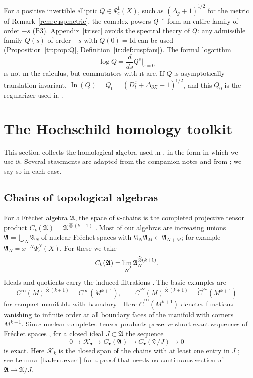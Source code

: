 \documentclass[11pt,oneside,reqno]{article}
\DeclareMathOperator{\In}{In}
\newcommand{\cK}{\mathcal K}
\newcommand{\Psic}{\Psi_{c}}
\newcommand{\CI}{C^\infty}
\newcommand{\dCI}{\dot C^\infty}
\newcommand{\lQ}{\log Q}
\theoremstyle{plain}
\theoremstyle{definition}
\theoremstyle{remark}
\begin{document}
For a positive invertible elliptic \(Q\in\Psic^1(X)\), such as
\((\Delta_g+1)^{1/2}\) for the metric of Remark~\ref{rem:cuspmetric}, the
complex powers \(Q^{-s}\) form an entire family of order \(-s\) (B3).
Appendix~\ref{tr:sec} avoids the spectral theory of \(Q\): any admissible
family \(Q(s)\) of order \(-s\) with \(Q(0)=\mathrm{Id}\) can be used
(Proposition~\ref{tr:prop:Q}, Definition~\ref{tr:def:cuspfam}). The
formal logarithm
\[
 \lQ=\frac{d}{ds}Q^s\Big|_{s=0}
\]
is not in the calculus, but commutators with it are. If \(Q\) is
asymptotically translation invariant, \(\In(Q)=Q_0=(D_t^2+\Delta_{\partial
X}+1)^{1/2}\), and this \(Q_0\) is the regularizer used in \cite[(60)]{MN}.

\section{The Hochschild homology toolkit}\label{sec:hhtools}

This section collects the homological algebra used in \cite{MN}, in the form
in which we use it. Several statements are adapted from the companion notes
\cite{HHb} and from \cite[Ch.~10]{MelroseMicro}; we say so in each case.

\subsection{Chains of topological algebras}\label{subsec:chains}
For a Fr\'echet algebra \(\mathfrak A\), the space of \(k\)-chains is the
completed projective tensor product \(C_k(\mathfrak A)=\mathfrak
A^{\widehat\otimes(k+1)}\) \cite[(36)]{MN}. Most of our algebras are
increasing unions \(\mathfrak A=\bigcup_N\mathfrak A_N\) of nuclear
Fr\'echet spaces with \(\mathfrak A_N\mathfrak A_M\subset\mathfrak
A_{N+M}\); for example \(\mathfrak A_N=x^{-N}\Psic^N(X)\). For these we
take
\[
 C_k(\mathfrak A)=\varinjlim_N\mathfrak A_N^{\widehat\otimes(k+1)} .
\]
Ideals and quotients carry the induced filtrations \cite[\S``The chain
model'']{HHb}. The basic examples are
\[
 \CI(M)^{\widehat\otimes(k+1)}=\CI(M^{k+1}),\qquad
 \dCI(M)^{\widehat\otimes(k+1)}=\dCI(M^{k+1})
\]
for compact manifolds with boundary \cite[proof of Lemma~1]{MN}. Here
\(\dCI(M^{k+1})\) denotes functions vanishing to infinite order at all
boundary faces of the manifold with corners \(M^{k+1}\). Since nuclear
completed tensor products preserve short exact sequences of Fr\'echet
spaces \cite{Treves}, for a closed ideal \(J\subset\mathfrak A\) the
sequence
\begin{equation}\label{eq:chainses}
 0\to\cK_\bullet\to C_\bullet(\mathfrak A)\to C_\bullet(\mathfrak A/J)\to0
\end{equation}
is exact. Here \(\cK_k\) is the closed span of the chains with at least one
entry in \(J\) \cite[Lemma ``Exactness of chain spaces'']{HHb}; see
Lemma~\ref{ha:lem:exact} for a proof that needs no continuous section of
\(\mathfrak A\to\mathfrak A/J\).
\end{document}
